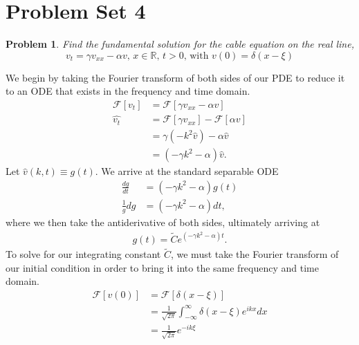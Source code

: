 \documentclass[12pt]{article}
\newtheorem{problem}{Problem}
\begin{document}
 
%

\rhead{\today}
 
\section*{Problem Set 4}

\begin{problem}
Find the fundamental solution for the cable equation on the real line, 
$$
v_t = \gamma v_{xx} - \alpha v \text{, } x \in \mathbb{R} \text{, } t > 0 \text{, with } v(0) = \delta(x-\xi)
$$
\end{problem}
We begin by taking the Fourier transform of both sides of our PDE to reduce it to an ODE that exists in the frequency and time domain.
\begin{align*}
    \mathcal{F}[v_t] & =\mathcal{F}[\gamma v_{xx} - \alpha v] \\
    \hat{v_t} & = \mathcal{F}[\gamma v_{xx}] -\mathcal{F} [\alpha v]\\
     & = \gamma (-k^2 \hat{v}) - \alpha \hat{v}\\
     & = (-\gamma k^2 - \alpha)\hat{v}.
\end{align*}
Let $\hat{v}(k,t) \equiv g(t)$. We arrive at the standard separable ODE
\begin{align*}
    \frac{dg}{dt} & = (-\gamma k^2 - \alpha)g(t) \\
    \frac{1}{g} dg & = (-\gamma k^2 - \alpha) dt \text{,}
\end{align*}
where we then take the antiderivative of both sides, ultimately arriving at
\begin{align}
    g(t) = \tilde{C}e^{(-\gamma k^2-\alpha)t} \text{.} \label{eq:ode1}
\end{align}
To solve for our integrating constant $\tilde{C}$, we must take the Fourier transform of our initial condition in order to bring it into the same frequency and time domain.
\begin{align*}
    \mathcal{F}[v(0)] &= \mathcal{F}[\delta(x-\xi)] \\
    & = \frac{1}{\sqrt{2\pi}} \int_{-\infty}^{\infty} \delta(x-\xi)e^{ikx}dx \\
    & = \frac{1}{\sqrt{2\pi}} e^{-ik\xi}
\end{align*}
\end{document}
